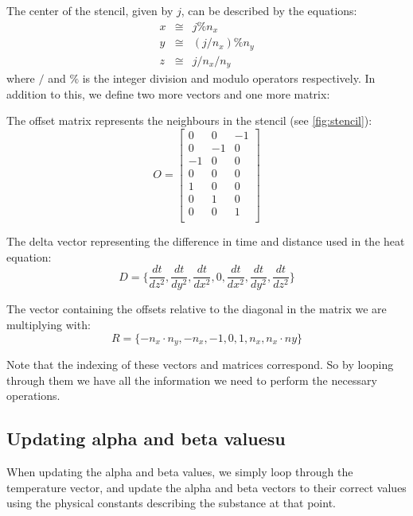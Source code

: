 The center of the stencil, given by $j$, can be described by the equations:
\begin{eqnarray}
  x & \cong & j\%n_x \\
  y & \cong & (j/n_x)\%n_y \\
  z & \cong & j/n_x/n_y 
\end{eqnarray}
where $/$ and $ \% $ is the integer division and modulo operators respectively.
In addition to this, we define two more vectors and one more matrix:

The offset matrix represents the neighbours in the stencil (see \cref{fig:stencil}):
\begin{equation}
O =
\left[
\begin{array}{ccc}
0 & 0 & -1 \\
0 & -1 & 0 \\
-1 & 0 & 0 \\
0 & 0 & 0 \\
1 & 0 & 0 \\
0 & 1 & 0 \\
0 & 0 & 1 \\
\end{array}
\right]
\end{equation}

The delta vector representing the difference in time and distance used in the heat
equation:
\begin{equation}
D = \{ \frac{dt}{dz^2}, \frac{dt}{dy^2}, \frac{dt}{dx^2}, 0, \frac{dt}{dx^2}, \frac{dt}{dy^2}, \frac{dt}{dz^2} \}
\end{equation}

The vector containing the offsets relative to the diagonal in the matrix we are multiplying
with:
\begin{equation}
R = \{ -n_x\cdot n_y, -n_x, -1, 0, 1, n_x, n_x\cdot ny \}
\end{equation}

Note that the indexing of these vectors and matrices correspond. So by looping through them
we have all the information we need to perform the necessary operations.

\subsection{Updating alpha and beta valuesu}

When updating the alpha and beta values, we simply loop through the temperature
vector, and update the alpha and beta vectors to their correct values using the
physical constants describing the substance at that point.

